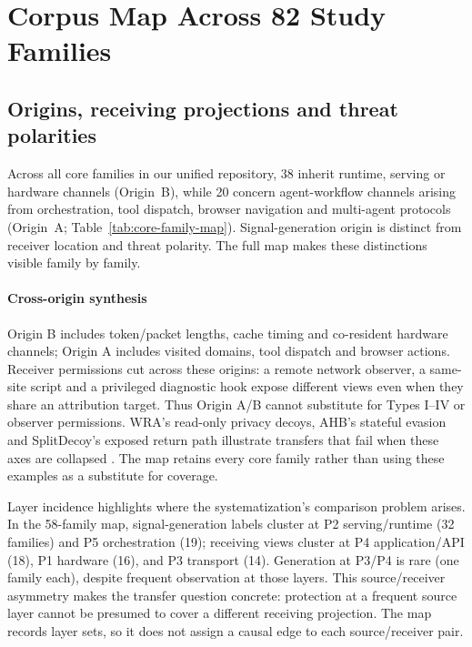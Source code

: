\section{Corpus Map Across 82 Study Families}\label{sec:corpus-map}
\subsection{Origins, receiving projections and threat polarities}
Across all \FinalCore{} core families in our unified repository, 38 inherit runtime, serving or hardware channels (Origin~B), while 20 concern agent-workflow channels arising from orchestration, tool dispatch, browser navigation and multi-agent protocols (Origin~A; Table~\ref{tab:core-family-map}). Signal-generation origin is distinct from receiver location and threat polarity. The full map makes these distinctions visible family by family.


\paragraph{Cross-origin synthesis}
Origin B includes token/packet lengths, cache timing and co-resident hardware channels; Origin A includes visited domains, tool dispatch and browser actions. Receiver permissions cut across these origins: a remote network observer, a same-site script and a privileged diagnostic hook expose different views even when they share an attribution target. Thus Origin A/B cannot substitute for Types I--IV or observer permissions. WRA's read-only privacy decoys, AHB's stateful evasion and SplitDecoy's exposed return path illustrate transfers that fail when these axes are collapsed \cite{jeong2026wra,zhu2026turing,politis2026splitdecoy}. The map retains every core family rather than using these examples as a substitute for coverage.

Layer incidence highlights where the systematization's comparison problem arises. In the 58-family map, signal-generation labels cluster at P2 serving/runtime (32 families) and P5 orchestration (19); receiving views cluster at P4 application/API (18), P1 hardware (16), and P3 transport (14). Generation at P3/P4 is rare (one family each), despite frequent observation at those layers. This source/receiver asymmetry makes the transfer question concrete: protection at a frequent source layer cannot be presumed to cover a different receiving projection. The map records layer sets, so it does not assign a causal edge to each source/receiver pair.

